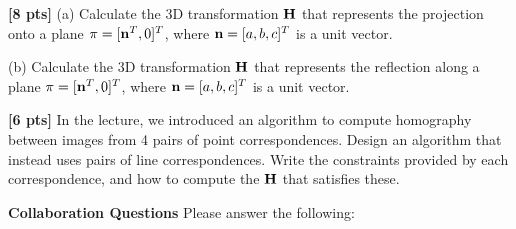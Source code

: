 \documentclass[11pt,addpoints,answers]{exam}
\numberwithin{equation}{section} %
\numberwithin{figure}{section} %
\numberwithin{table}{section} %
\begin{document}
\begin{questions}
\begin{tcolorbox}[fit,height=5cm, width=\textwidth, blank, borderline={0.5pt}{-2pt},halign=left, valign=center, nobeforeafter]



\end{tcolorbox}

\question \textbf{[8 pts]} (a) Calculate the 3D transformation $\mathbf{H}$ that represents the projection onto a plane $\pi = [\mathbf{n}^T, 0]^T$, where $\mathbf{n} = [a,b,c]^T$ is a unit vector.

(b) Calculate the 3D transformation $\mathbf{H}$ that represents the reflection along a plane $\pi = [\mathbf{n}^T, 0]^T$, where $\mathbf{n} = [a,b,c]^T$ is a unit vector.

\begin{tcolorbox}[fit,height=15cm, width=\textwidth, blank, borderline={0.5pt}{-2pt},halign=left, valign=center, nobeforeafter]



\end{tcolorbox}

\question \textbf{[6 pts]} In the lecture, we introduced an algorithm to compute homography between images from 4 pairs of point correspondences. Design an algorithm that instead uses pairs of line correspondences. Write the constraints provided by each correspondence, and how to compute the $\mathbf{H}$ that satisfies these.

\begin{tcolorbox}[fit,height=5cm, width=\textwidth, blank, borderline={0.5pt}{-2pt},halign=left, valign=center, nobeforeafter]



\end{tcolorbox}


\end{questions}

\clearpage

\textbf{Collaboration Questions} Please answer the following:
\end{document}
